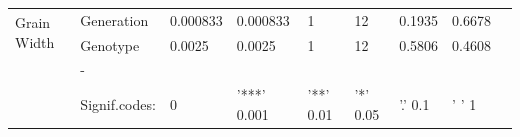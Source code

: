\documentclass{article}
\begin{document}
\begin{table}[ht]
\begin{adjustbox}
\begin{tabular}{@{}lllllllll@{}}
			\midrule \multirow{2}{*}{Grain Width}  & Generation    & 0.000833        & 0.000833         & 1              & 12             & 0.1935          & 0.6678                       &   \\
			                                       & Genotype      & 0.0025          & 0.0025           & 1              & 12             & 0.5806          & 0.4608                       &   \\
			                                       & -             &                 &                  &                &                &                 &                              &   \\
			                                       & Signif.codes: & 0               & '***' 0.001      & '**' 0.01      & '*' 0.05       & '.' 0.1         & ' ' 1                        &   \\
			\bottomrule
		\end{tabular}
	\end{adjustbox}
	\label{rothamstead_phenotype_stats}
\end{table}
\end{document}
